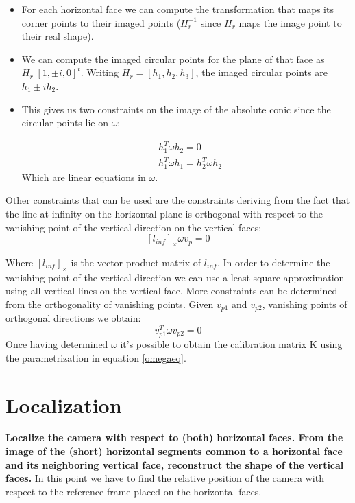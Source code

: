 \documentclass[11pt, oneside]{article}   	%
\begin{document}
\begin{itemize}
\item For each horizontal face we can compute the transformation that maps its corner points to their imaged points ($H_r^{-1}$ since $H_r$ maps the image point to their real shape).
\item We can compute the imaged circular points for the plane of that face as $H_r \; [1,\pm i, 0]^t$. Writing $H_r = [h_1, h_2, h_3] $, the imaged circular points are $h_1 \pm ih_2 $.
\item This gives us two constraints on the image of the absolute conic since the circular points lie on $\omega$:

   \begin{subequations} \label{heq}
   \begin{align*}
   & h_1^T\omega h_2= 0 \\ 
   & h_1^T\omega h_1= h_2^T\omega h_2 
   \end{align*}
   \end{subequations}
   Which are linear equations in $\omega$.

\end{itemize}
Other constraints that can be used are the constraints deriving from the fact that the line at infinity on the horizontal plane is orthogonal with respect to the vanishing point of the vertical direction on the vertical faces:
\begin{equation} \label{linfeq}
[l_{inf}]_\times\omega v_p = 0
\end{equation} 

Where $[l_{inf}]_\times$ is the vector product matrix of $l_{inf}$.
In order to determine the vanishing point of the vertical direction we can use a least square approximation using all vertical lines on the vertical face.
More constraints can be determined from the orthogonality of vanishing points. Given $v_{p1}$ and $v_{p2}$, vanishing points of orthogonal directions we obtain:
\begin{equation} \label{vpeq}
v_{p1}^T \omega v_{p2} = 0 
\end{equation}
Once having determined $\omega$ it's possible to obtain the calibration matrix K using the parametrization in equation \ref{omegaeq}. 

\section{Localization}
\textbf{ Localize the camera with respect to (both) horizontal faces. From the image of the (short) horizontal segments common to a horizontal face and its neighboring vertical face, reconstruct the shape of the vertical faces.} \hfill \break
In this point we have to find the relative position of the camera with respect to the reference frame placed on the horizontal faces.
\end{document}
